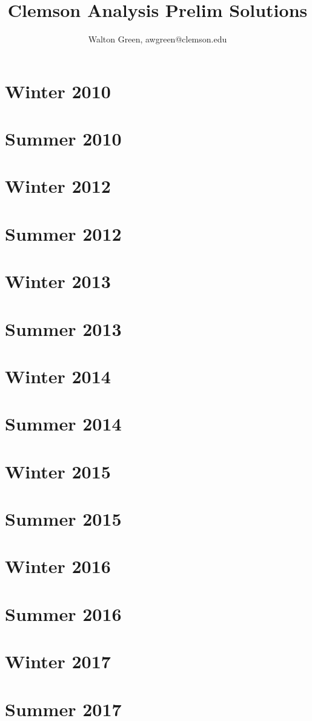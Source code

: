\documentclass[12pt]{article}
\title{Clemson Analysis Prelim Solutions}
\author{Walton Green, awgreen@clemson.edu}
\begin{document}
\maketitle

\tableofcontents
\newpage
\section{Winter 2010}\label{sec:w10}

\newpage
\section{Summer 2010}\label{sec:s10}

\newpage
\section{Winter 2012}\label{sec:w12}

\newpage
\section{Summer 2012}\label{sec:s12}

\newpage
\section{Winter 2013}\label{sec:w13}

\newpage
\section{Summer 2013}\label{sec:s13}

\newpage
\section{Winter 2014}\label{sec:w14}

\newpage
\section{Summer 2014}\label{sec:s14}

\newpage\section{Winter 2015}\label{sec:w15}

\newpage
\section{Summer 2015}\label{sec:s15}

\newpage
\section{Winter 2016}\label{sec:w16}

\newpage
\section{Summer 2016}\label{sec:s16}

\newpage
\section{Winter 2017}\label{sec:w17}

\newpage
\section{Summer 2017}\label{sec:s17}

\end{document}
